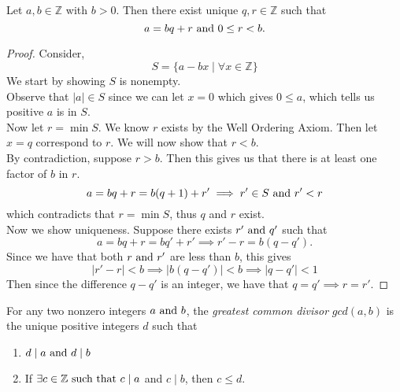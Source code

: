 \documentclass[../main.tex]{subfiles}
\begin{document}
\begin{theorem}\label{thm:division_algorithim}
Let \(a,b \in \mathbb{Z}\) with \(b>0\). Then there exist unique \(q,r \in \mathbb{Z}\) such that \[
a = bq+r \textnormal{ and } 0 \leq r < b.
\]
\end{theorem}




\begin{proof}
Consider, 
\[
S = \{a - bx \mid \forall x \in \mathbb{Z}\}
\]
We start by showing \(S\) is nonempty.\\
Observe that \(|a| \in S \) since we can let \(x = 0\) which gives \(0 \leq a\), which tells us positive \(a\) is in \(S\).\\
Now let \(r = \min S\). We know \(r\) exists by the Well Ordering Axiom. Then let \(x = q\) correspond to \(r\). We will now show that \(r < b\).\\
By contradiction, suppose \(r > b\). Then this gives us that there is at least one factor of \(b\) in \(r\).
\[
a = bq + r = b(q+1) + r' \implies r' \in S \textnormal{ and } r' < r\]
which contradicts that \(r = \min S\), thus \(q\) and \(r\) exist.\\
Now we show uniqueness. Suppose there exists \(r' \textnormal{ and }q'\) such that \[
a = bq + r = bq' + r' \implies r' - r = b(q-q').
\]
Since we have that both \(r \textnormal{ and } r' \) are less than \(b\), this gives 
\[
\mid r' - r \mid < b \implies \mid b(q - q') \mid < b \implies \mid q - q' \mid < 1
\]
Then since the difference \(q - q'\) is an integer, we have that \(q = q' \implies r = r'\).
\end{proof}

\begin{definition}\label{def:gcd}
For any two nonzero integers \(a \textnormal{ and } b\), the \textit{greatest common divisor} \(gcd(a,b)\) is the unique positive integers \(d\) such that
\begin{enumerate}
    \item \(d \mid a \textnormal{ and } d \mid b\)
    \item If \( \exists c \in \mathbb{Z} \textnormal{ such that } c \mid a \) and \(c \mid b\), then \(c \leq d\).
\end{enumerate}
    
\end{definition}
\end{document}
